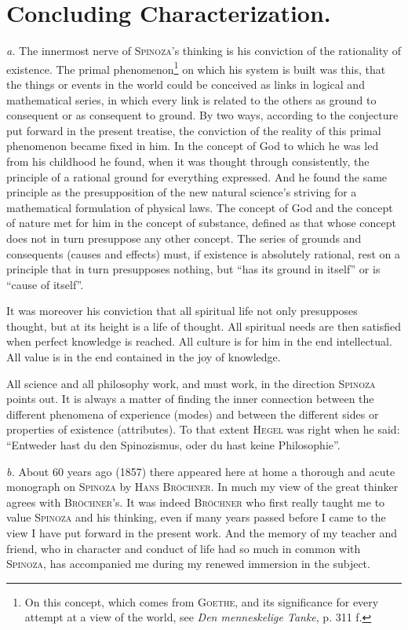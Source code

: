 \documentclass[12pt]{article}
\newcommand{\opage}[1]{\marginnote{\footnotesize\textit{[#1]}}}
\begin{document}
\opage{95}\section*{Concluding Characterization.}

\textit{a.} The innermost nerve of \textsc{Spinoza}'s thinking is his conviction of the rationality
of existence. The primal phenomenon\footnote{On this concept, which comes from \textsc{Goethe}, and
its significance for every attempt at a view of the world, see \textit{Den menneskelige Tanke}, p.
311 f.} on which his system is built was this, that the things or events in the world could be
conceived as links in logical and mathematical series, in which every link is related to the others
as ground to consequent or as consequent to ground. By two ways, according to the conjecture put
forward in the present treatise, the conviction of the reality of this primal phenomenon became
fixed in him. In the concept of God to which he was led from his childhood he found, when it was
thought through consistently, the principle of a rational ground for everything expressed. And he
found the same principle as the presupposition of the new natural science's striving for a
mathematical formulation of physical laws. The concept of God and the concept of nature met for him
in the concept of substance, defined as that whose concept does not in turn presuppose any other
concept. The series of grounds and consequents (causes and effects) must, if existence is absolutely
rational, rest on a principle that in turn presupposes nothing, but ``has its ground in itself'' or
is ``cause of itself''.

It was moreover his conviction that all spiritual life not only presupposes thought, but at its
height is a life of thought. All spiritual needs are then satisfied when perfect knowledge is
reached. All culture is for him in the end intellectual. All value is in the end contained in the
joy of knowledge.

All science and all philosophy work, and must work, in the direction \textsc{Spinoza} points out. It
is always a matter of finding the inner connection between the different phenomena of experience
(modes) and between the different sides or properties of existence (attributes). To that extent
\textsc{Hegel} was right when he said: ``Entweder hast du den Spinozismus, oder du hast keine
Philosophie''.

\textit{b.} About 60 years ago (1857) there appeared here at home a thorough and acute monograph on
\textsc{Spinoza} by \textsc{Hans Bröchner}. In much my view of the great thinker agrees with
\textsc{Bröchner}'s. It was indeed \textsc{Bröchner} who first really taught me to value
\textsc{Spinoza} and his thinking, even if \opage{96}many years passed before I came to the view I
have put forward in the present work. And the memory of my teacher and friend, who in character
and conduct of life had so much in common with \textsc{Spinoza}, has accompanied me during my
renewed immersion in the subject.
\end{document}
